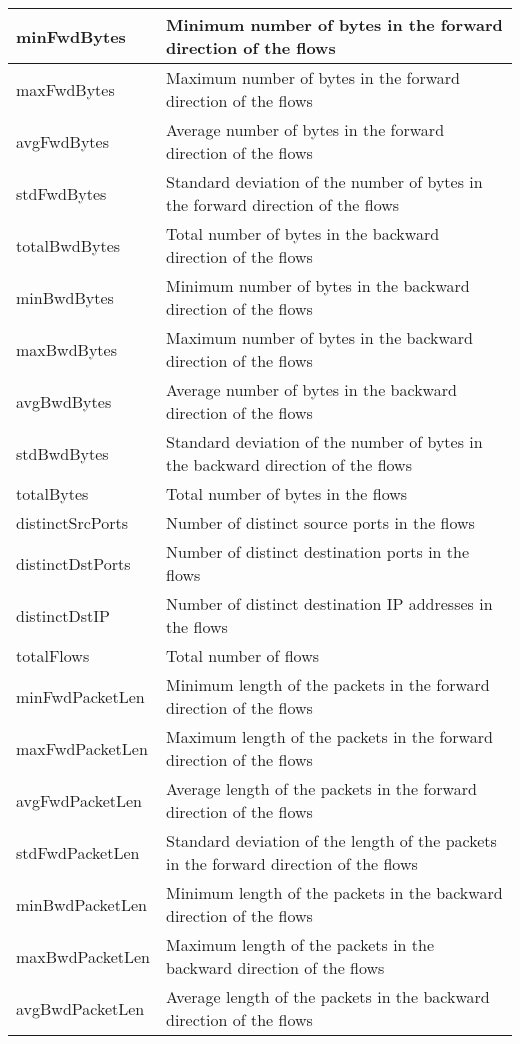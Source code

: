 \begin{table}[H]
\begin{tabular}{|l|l|}
minFwdBytes & Minimum number of bytes in the forward direction of the flows \\ \hline
maxFwdBytes & Maximum number of bytes in the forward direction of the flows \\ \hline
avgFwdBytes & Average number of bytes in the forward direction of the flows \\ \hline
stdFwdBytes & Standard deviation of the number of bytes in the forward direction of the flows \\ \hline
totalBwdBytes & Total number of bytes in the backward direction of the flows \\ \hline
minBwdBytes & Minimum number of bytes in the backward direction of the flows \\ \hline
maxBwdBytes & Maximum number of bytes in the backward direction of the flows \\ \hline
avgBwdBytes & Average number of bytes in the backward direction of the flows \\ \hline
stdBwdBytes & Standard deviation of the number of bytes in the backward direction of the flows \\ \hline
totalBytes & Total number of bytes in the flows \\ \hline
distinctSrcPorts & Number of distinct source ports in the flows \\ \hline
distinctDstPorts & Number of distinct destination ports in the flows \\ \hline
distinctDstIP & Number of distinct destination IP addresses in the flows \\ \hline
totalFlows & Total number of flows \\ \hline
minFwdPacketLen & Minimum length of the packets in the forward direction of the flows \\ \hline
maxFwdPacketLen & Maximum length of the packets in the forward direction of the flows \\ \hline
avgFwdPacketLen & Average length of the packets in the forward direction of the flows \\ \hline
stdFwdPacketLen & Standard deviation of the length of the packets in the forward direction of the flows \\ \hline
minBwdPacketLen & Minimum length of the packets in the backward direction of the flows \\ \hline
maxBwdPacketLen & Maximum length of the packets in the backward direction of the flows \\ \hline
avgBwdPacketLen & Average length of the packets in the backward direction of the flows \\ \hline

\end{tabular}
\end{table}
